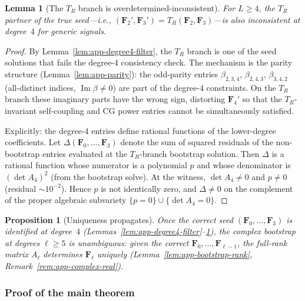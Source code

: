 \documentclass{article}
\newtheorem{proposition}[theorem]{Proposition}
\newtheorem{lemma}[theorem]{Lemma}
\theoremstyle{definition}
\theoremstyle{remark}
\DeclareMathOperator{\im}{Im}
\theoremstyle{definition}
\begin{document}
\begin{lemma}[The $T_R$ branch is overdetermined-inconsistent]
\label{lem:app-TR-resolve}
For $L \ge 4$, the $T_R$ partner of the true seed---i.e.,
$(\mathbf{F}_2', \mathbf{F}_3') = T_R(\mathbf{F}_2, \mathbf{F}_3)$---is
also inconsistent at degree~$4$ for generic signals.
\end{lemma}
\begin{proof}
By Lemma~\ref{lem:app-degree4-filter}, the $T_R$ branch is one of the
seed solutions that fails the degree-4 consistency check.
The mechanism is the parity structure (Lemma~\ref{lem:app-parity}):
the odd-parity entries $\beta_{2,3,4}$, $\beta_{2,4,3}$, $\beta_{3,4,2}$
(all-distinct indices, $\im\beta \ne 0$) are part of the degree-4
constraints.  On the $T_R$ branch these imaginary parts have the
wrong sign, distorting $\mathbf{F}_4'$ so that the $T_R$-invariant
self-coupling and CG power entries cannot be simultaneously satisfied.

Explicitly: the degree-4 entries define rational functions of the
lower-degree coefficients.  Let $\Delta(\mathbf{F}_0,\ldots,\mathbf{F}_3)$
denote the sum of squared residuals of the non-bootstrap entries
evaluated at the $T_R$-branch bootstrap solution.
Then $\Delta$ is a rational function whose numerator is a polynomial $p$
and whose denominator is $(\det A_4)^2$ (from the bootstrap solve).
At the witness, $\det A_4 \ne 0$ and $p \ne 0$
(residual ${\sim}10^{-2}$).
Hence $p$ is not identically zero, and $\Delta \ne 0$ on the complement
of the proper algebraic subvariety $\{p = 0\} \cup \{\det A_4 = 0\}$.
\end{proof}

\begin{proposition}[Uniqueness propagates]\label{prop:app-TR-propagate}
Once the correct seed $(\mathbf{F}_0, \ldots, \mathbf{F}_3)$ is identified
at degree~$4$ (Lemmas~\ref{lem:app-degree4-filter}--\ref{lem:app-TR-resolve}),
the complex bootstrap at degrees $\ell \ge 5$ is unambiguous:
given the correct $\mathbf{F}_0, \ldots, \mathbf{F}_{\ell-1}$, the
full-rank matrix $A_\ell$ determines $\mathbf{F}_\ell$ uniquely
(Lemma~\ref{lem:app-bootstrap-rank}, Remark~\ref{rem:app-complex-real}).
\end{proposition}

\subsubsection{Proof of the main theorem}
\end{document}
